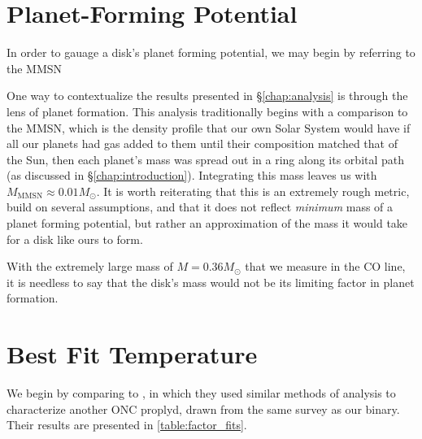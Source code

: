 \section{Planet-Forming Potential}
\label{section:fitting_procedure}

In order to gauage a disk's planet forming potential, we may begin by referring to the MMSN

One way to contextualize the results presented in \S\ref{chap:analysis} is through the lens of planet formation. This analysis traditionally begins with a comparison to the MMSN, which is the density profile that our own Solar System would have if all our planets had gas added to them until their composition matched that of the Sun, then each planet's mass was spread out in a ring along its orbital path (as discussed in \S\ref{chap:introduction}). Integrating this mass leaves us with $M_\text{MMSN} \approx 0.01 M_\odot$. It is worth reiterating that this is an extremely rough metric, build on several assumptions, and that it does not reflect \textit{minimum} mass of a planet forming potential, but rather an approximation of the mass it would take for a disk like ours to form.

With the extremely large mass of $M = 0.36M_\odot$ that we measure in the CO line, it is needless to say that the disk's mass would not be its limiting factor in planet formation.





\section{Best Fit Temperature }
\label{section:fitting_procedure}

We begin by comparing to \citet{Factor2017}, in which they used similar methods of analysis to characterize another ONC proplyd, drawn from the same survey as our binary. Their results are presented in \ref{table:factor_fits}.



